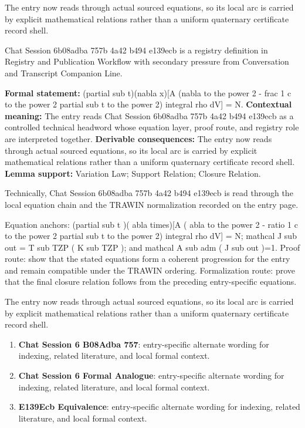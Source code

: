 The entry now reads through actual sourced equations, so its local arc is carried by explicit mathematical relations rather than a uniform quaternary certificate record shell.
\clearpage


\begingroup\small
{}
Chat Session 6b08adba 757b 4a42 b494 e139ecb is a registry definition in Registry and Publication Workflow with secondary pressure from Conversation and Transcript Companion Line.

\begingroup\footnotesize\setlength{\emergencystretch}{3em}\sloppy
\textbf{Formal statement:} (partial sub t)(nabla x)[A (nabla to the power 2 - frac 1 c to the power 2 partial sub t to the power 2) integral rho dV] = N. \textbf{Contextual meaning:} The entry reads Chat Session 6b08adba 757b 4a42 b494 e139ecb as a controlled technical headword whose equation layer, proof route, and registry role are interpreted together. \textbf{Derivable consequences:} The entry now reads through actual sourced equations, so its local arc is carried by explicit mathematical relations rather than a uniform quaternary certificate record shell. \textbf{Lemma support:} Variation Law; Support Relation; Closure Relation.\par
\endgroup

Technically, Chat Session 6b08adba 757b 4a42 b494 e139ecb is read through the local equation chain and the TRAWIN normalization recorded on the entry page.

Equation anchors: (partial sub t )( abla times)[A ( abla to the power 2 - ratio 1 c to the power 2 partial sub t to the power 2) integral rho dV] = N; mathcal J sub out = T sub TZP ( K sub TZP ); and mathcal A sub adm ( J sub out )=1. Proof route: show that the stated equations form a coherent progression for the entry and remain compatible under the TRAWIN ordering. Formalization route: prove that the final closure relation follows from the preceding entry-specific equations.

The entry now reads through actual sourced equations, so its local arc is carried by explicit mathematical relations rather than a uniform quaternary certificate record shell.
\endgroup

\begin{enumerate}[leftmargin=1.6em,itemsep=6pt,topsep=4pt]
\item \textbf{Chat Session 6 B08Adba 757}: entry-specific alternate wording for indexing, related literature, and local formal context.
\item \textbf{Chat Session 6 Formal Analogue}: entry-specific alternate wording for indexing, related literature, and local formal context.
\item \textbf{E139Ecb Equivalence}: entry-specific alternate wording for indexing, related literature, and local formal context.
\end{enumerate}

